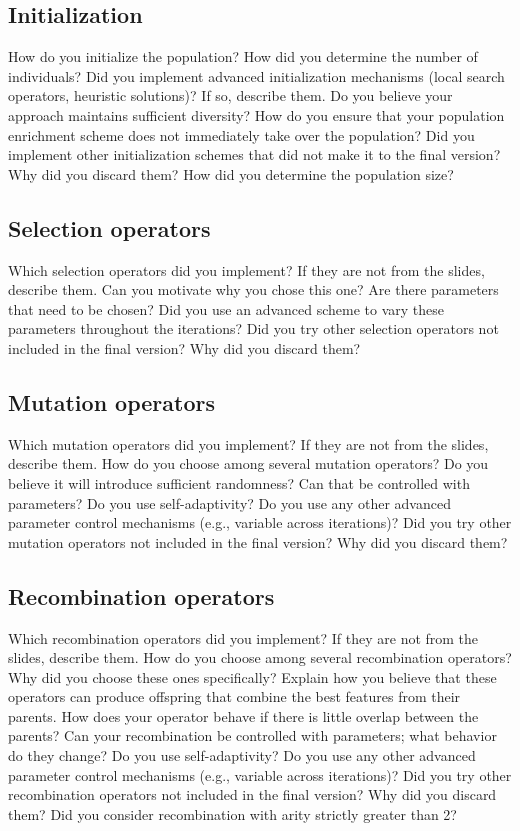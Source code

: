 \documentclass[a4paper,10pt]{article}
\newcommand{\ReplaceMe}[1]{{\color{blue}#1}}
\begin{document}
\subsection{Initialization}

\ReplaceMe{How do you initialize the population? How did you determine the number of individuals? Did you implement advanced initialization mechanisms (local search operators, heuristic solutions)? If so, describe them. Do you believe your approach maintains sufficient diversity? How do you ensure that your population enrichment scheme does not immediately take over the population? Did you implement other initialization schemes that did not make it to the final version? Why did you discard them? How did you determine the population size?}

\subsection{Selection operators}

\ReplaceMe{Which selection operators did you implement? If they are not from the slides, describe them. Can you motivate why you chose this one? Are there parameters that need to be chosen? Did you use an advanced scheme to vary these parameters throughout the iterations? Did you try other selection operators not included in the final version? Why did you discard them?}

\subsection{Mutation operators}

\ReplaceMe{Which mutation operators did you implement? If they are not from the slides, describe them. How do you choose among several mutation operators? Do you believe it will introduce sufficient randomness? Can that be controlled with parameters? Do you use self-adaptivity? Do you use any other advanced parameter control mechanisms (e.g., variable across iterations)? Did you try other mutation operators not included in the final version? Why did you discard them?}

\subsection{Recombination operators}

\ReplaceMe{Which recombination operators did you implement? If they are not from the slides, describe them. How do you choose among several recombination operators? Why did you choose these ones specifically? Explain how you believe that these operators can produce offspring that combine the best features from their parents. How does your operator behave if there is little overlap between the parents? Can your recombination be controlled with parameters; what behavior do they change? Do you use self-adaptivity? Do you use any other advanced parameter control mechanisms (e.g., variable across iterations)? Did you try other recombination operators not included in the final version? Why did you discard them? Did you consider recombination with arity strictly greater than 2?}
\end{document}
